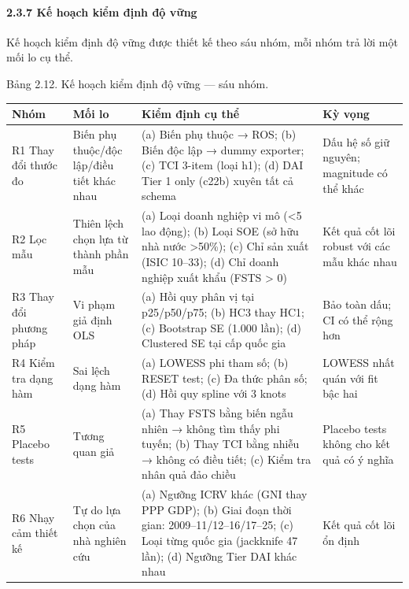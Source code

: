 \documentclass[12pt,a4paper]{article}
\begin{document}
\hypertarget{237-kux1ebf-houx1ea1ch-kiux1ec3m-ux111ux1ecbnh-ux111ux1ed9-vux1eefng}{%
\paragraph{2.3.7 Kế hoạch kiểm định độ
vững}\label{237-kux1ebf-houx1ea1ch-kiux1ec3m-ux111ux1ecbnh-ux111ux1ed9-vux1eefng}}

Kế hoạch kiểm định độ vững được thiết kế theo sáu nhóm, mỗi nhóm trả lời
một mối lo cụ thể.

Bảng 2.12. Kế hoạch kiểm định độ vững --- sáu nhóm.

\begin{longtable}[]{@{}llll@{}}
\toprule\noalign{}
Nhóm & Mối lo & Kiểm định cụ thể & Kỳ vọng \\
\midrule\noalign{}
\endhead
\bottomrule\noalign{}
\endlastfoot
R1 Thay đổi thước đo & Biến phụ thuộc/độc lập/điều tiết khác nhau & (a)
Biến phụ thuộc → ROS; (b) Biến độc lập → dummy exporter; (c) TCI 3-item
(loại h1); (d) DAI Tier 1 only (c22b) xuyên tất cả schema & Dấu hệ số
giữ nguyên; magnitude có thể khác \\
R2 Lọc mẫu & Thiên lệch chọn lựa từ thành phần mẫu & (a) Loại doanh
nghiệp vi mô (\textless5 lao động); (b) Loại SOE (sở hữu nhà nước
\textgreater50\%); (c) Chỉ sản xuất (ISIC 10--33); (d) Chỉ doanh nghiệp
xuất khẩu (FSTS \textgreater{} 0) & Kết quả cốt lõi robust với các mẫu
khác nhau \\
R3 Thay đổi phương pháp & Vi phạm giả định OLS & (a) Hồi quy phân vị tại
p25/p50/p75; (b) HC3 thay HC1; (c) Bootstrap SE (1.000 lần); (d)
Clustered SE tại cấp quốc gia & Bảo toàn dấu; CI có thể rộng hơn \\
R4 Kiểm tra dạng hàm & Sai lệch dạng hàm & (a) LOWESS phi tham số; (b)
RESET test; (c) Đa thức phân số; (d) Hồi quy spline với 3 knots & LOWESS
nhất quán với fit bậc hai \\
R5 Placebo tests & Tương quan giả & (a) Thay FSTS bằng biến ngẫu nhiên →
không tìm thấy phi tuyến; (b) Thay TCI bằng nhiễu → không có điều tiết;
(c) Kiểm tra nhân quả đảo chiều & Placebo tests không cho kết quả có ý
nghĩa \\
R6 Nhạy cảm thiết kế & Tự do lựa chọn của nhà nghiên cứu & (a) Ngưỡng
ICRV khác (GNI thay PPP GDP); (b) Giai đoạn thời gian:
2009--11/12--16/17--25; (c) Loại từng quốc gia (jackknife 47 lần); (d)
Ngưỡng Tier DAI khác nhau & Kết quả cốt lõi ổn định \\
\end{longtable}
\end{document}
